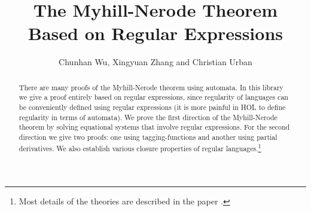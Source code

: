\documentclass[11pt,a4paper]{article}
\begin{document}
\title{The Myhill-Nerode Theorem\\ Based on Regular Expressions}
\author{Chunhan Wu, Xingyuan Zhang and Christian Urban}
\maketitle

\begin{abstract}
There are many proofs of the Myhill-Nerode theorem using automata. In this
library we give a proof entirely based on regular expressions, since
regularity of languages can be conveniently defined using regular expressions
(it is more painful in HOL to define regularity in terms of automata).  We
prove the first direction of the Myhill-Nerode theorem by solving equational
systems that involve regular expressions.  For the second direction we give two
proofs: one using tagging-functions and another using partial derivatives. We
also establish various closure properties of regular languages.\footnote{Most
details of the theories are described in the paper \cite{WuZhangUrban11}.}
\end{abstract}

\tableofcontents
\bigskip





\end{document}
